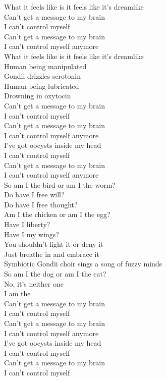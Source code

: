 What it feels like is it feels like it's dreamlike\\

Can't get a message to my brain\\
I can't control myself\\
Can't get a message to my brain\\
I can't control myself anymore\\

What it feels like is it feels like it's dreamlike\\

Human being manipulated\\
Gondii drizzles serotonin\\
Human being lubricated\\
Drowning in oxytocin\\

Can't get a message to my brain\\
I can't control myself\\
Can't get a message to my brain\\
I can't control myself anymore\\
I've got oocysts inside my head\\
I can't control myself\\
Can't get a message to my brain\\
I can't control myself anymore\\

So am I the bird or am I the worm?\\
Do have I free will?\\
Do have I free thought?\\

Am I the chicken or am I the egg?\\
Have I liberty?\\
Have I my wings?\\

You shouldn't fight it or deny it\\
Just breathe in and embrace it\\
Symbiotic Gondii choir sings a song of fuzzy minds\\

So am I the dog or am I the cat?\\
No, it's neither one\\
I am the \\

Can't get a message to my brain\\
I can't control myself\\
Can't get a message to my brain\\
I can't control myself anymore\\
I've got oocysts inside my head\\
I can't control myself\\
Can't get a message to my brain\\
I can't control myself\\

